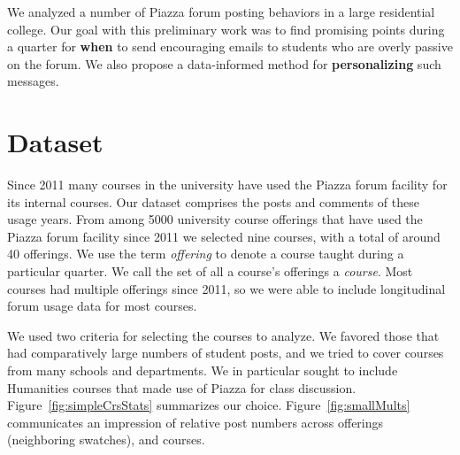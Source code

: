 We analyzed a number of Piazza forum posting behaviors in a large
residential college. Our goal with this preliminary work was to find
promising points during a quarter for {\bf when} to send encouraging
emails to students who are overly passive on the forum. We also
propose a data-informed method for {\bf personalizing} such messages.

\section{Dataset}

Since 2011 many courses in the university have used the Piazza forum
facility for its internal courses. Our dataset comprises the posts and
comments of these usage years. From among 5000 university course
offerings that have used the Piazza forum facility since 2011 we
selected nine courses, with a total of around 40 offerings. We use the
term {\em offering} to denote a course taught during a particular
quarter. We call the set of all a course's offerings a {\em course}.
Most courses had multiple offerings since 2011, so we were able to
include longitudinal forum usage data for most courses.

We used two criteria for selecting the courses to analyze. We favored
those that had comparatively large numbers of student posts, and we
tried to cover courses from many schools and departments. We in
particular sought to include Humanities courses that made use of
Piazza for class discussion. Figure~\ref{fig:simpleCrsStats}
summarizes our choice. Figure~\ref{fig:smallMults} communicates an
impression of relative post numbers across offerings (neighboring
swatches), and courses.
 
